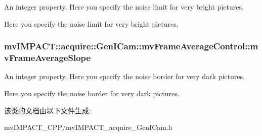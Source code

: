 An integer property. Here you specify the noise limit for very bright pictures. 

Here you specify the noise limit for very bright pictures. \hypertarget{classmv_i_m_p_a_c_t_1_1acquire_1_1_gen_i_cam_1_1mv_frame_average_control_a5007bc8f63e6636ba4b9b861226d9c5c}{
\subsubsection[{mv\+Frame\+Average\+Slope}]{ mv\+I\+M\+P\+A\+C\+T\+::acquire\+::\+Gen\+I\+Cam\+::mv\+Frame\+Average\+Control\+::mv\+Frame\+Average\+Slope}}\label{classmv_i_m_p_a_c_t_1_1acquire_1_1_gen_i_cam_1_1mv_frame_average_control_a5007bc8f63e6636ba4b9b861226d9c5c}


An integer property. Here you specify the noise border for very dark pictures. 

Here you specify the noise border for very dark pictures. 

该类的文档由以下文件生成\+:\begin{DoxyCompactItemize}
\item 
mv\+I\+M\+P\+A\+C\+T\+\_\+\+C\+P\+P/mv\+I\+M\+P\+A\+C\+T\+\_\+acquire\+\_\+\+Gen\+I\+Cam.\+h\end{DoxyCompactItemize}
